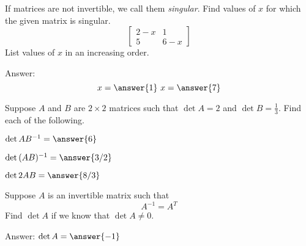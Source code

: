 \documentclass{ximera}
\begin{document}
  \begin{problem}\label{prob:singmatrixdet3}
    If matrices are not invertible, we call them \emph{singular}. Find values of $x$ for which the given matrix is singular.
    $$\begin{bmatrix}2-x&1\\5&6-x\end{bmatrix}$$
    List values of $x$ in an increasing order.
     
    Answer:
    $$x=\answer{1}\quad x=\answer{7}$$
    \end{problem}

    \begin{problem}
      Suppose $A$ and $B$ are $2\times 2$ matrices such that $\det{A}=2$ and $\det{B}=\frac{1}{3}$.  Find each of the following.
        \begin{problem}\label{prob:detproduct1a}
        $\det{AB^{-1}}=\answer{6}$
        \end{problem}
         
         \begin{problem}\label{prob:detproduct1b}
        $\det{(AB)^{-1}}=\answer{3/2}$
        \end{problem}
         
         \begin{problem}\label{prob:detproduct1c}
        $\det{2AB}=\answer{8/3}$
        \end{problem}
      \end{problem}

   
  \begin{problem}\label{prob:detinvertible1}
  Suppose $A$ is an invertible matrix such that $$A^{-1}=A^T$$
  Find $\det{A}$ if we know that $\det{A}\neq 0$.
   
  Answer: $\det{A}=\answer{-1}$
  \end{problem}
\end{document}
